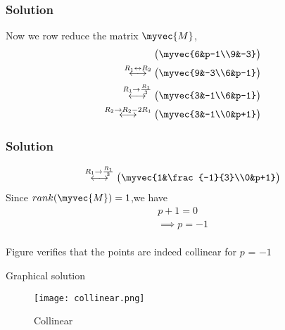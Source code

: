 \documentclass{beamer}
\begin{document}
\begin{frame}
\frametitle{Solution}
Now we row reduce the matrix $\myvec{M}$,
\begin{align}
\begin{pmatrix}\myvec{6&p-1\\9&-3}
    \end{pmatrix}
    \\
    \overset{R_1\leftrightarrow R_2}{\longleftrightarrow}
\begin{pmatrix}\myvec{9&-3\\6&p-1}\end{pmatrix}
\\
\overset{R_1\rightarrow \frac{R_1}{3}}{\longleftrightarrow}
\begin{pmatrix}\myvec{3&-1\\6&p-1}\end{pmatrix}
\\
\overset{R_2\rightarrow R_2-2R_1}{\longleftrightarrow}
\begin{pmatrix}\myvec{3&-1\\0&p+1}\end{pmatrix}\\
\end{align}
\end{frame}

\begin{frame}
\frametitle{Solution}
\begin{align}
    \overset{R_1\rightarrow \frac{R_1}{3}}{\longleftrightarrow}
\begin{pmatrix}
\myvec{1&\frac{-1}{3}\\0&p+1}
\end{pmatrix}
\end{align}
Since $rank(\myvec{M})=1$,we have
\begin{align}
 p+1=0 \\
\implies p=-1
 \end{align}\\
 Figure  verifies that the points are indeed collinear for $p$ = $-1$

\end{frame}
\begin{frame}{Graphical solution}   
\begin{figure}[ht]
    \centering
    \texttt{[image: collinear.png]}
    \caption{Collinear}
    \label{Graphical solution}
\end{figure}

\end{frame}
\end{document}
